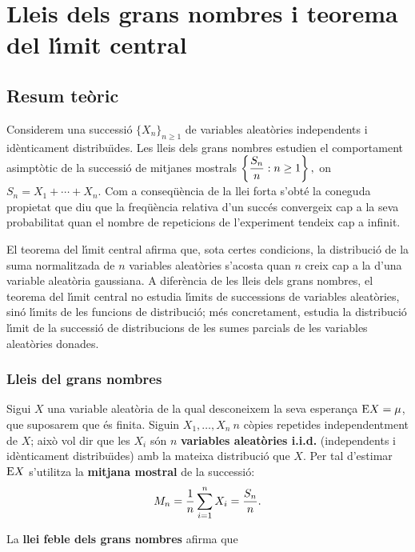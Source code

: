 \chapter{Lleis dels grans nombres i teorema del l\'{\i}mit central}

\section{Resum te\`oric}

Considerem una successi\'o $\{ X_n \}_{n \geq 1}$ de variables aleat\`ories 
independents i id\`en\-ti\-ca\-ment distribu\"{\i}des. 
Les lleis dels grans nombres estudien el 
comportament asimpt\`otic de la successi\'o de mitjanes mostrals 
$\displaystyle \left\{ {S_n \over n} : n \geq 1 \right\},$ on $S_n = X_1 + \cdots + X_n.$ 
Com a conseq\"u\`encia de la llei forta s'obt\'e la coneguda propietat que 
diu que la freq\"u\`encia relativa d'un succ\'es convergeix cap a la seva
probabilitat quan el nombre de repeticions de l'experiment tendeix cap a infinit.

El teorema del l\'{\i}mit central afirma que, sota certes condicions, la distribuci\'o
de la suma normalitzada de $n$ variables aleat\`ories s'acosta quan $n$ creix cap
a la d'una variable aleat\`oria gaussiana. A difer\`encia de les lleis dels grans nombres, 
el teorema del l\'{\i}mit central no estudia l\'{\i}mits de successions de variables aleat\`ories, 
sin\'o l\'{\i}mits de les funcions de distribuci\'o; m\'es concretament, estudia la distribuci\'o l\'{\i}mit 
de la successi\'o de distribucions de les sumes parcials de les variables aleat\`ories donades.

\subsection{Lleis del grans nombres}

Sigui $X$ una variable aleat\`oria de la qual desconeixem la seva esperan\c ca ${\rm E} X =
\mu$, que suposarem que \'es finita. Siguin $X_1, \ldots , X_n \ n$ c\`opies
repetides independentment de $X$; aix\`o vol dir que les $X_i$ s\'on $n$  {\bf variables
aleat\`ories i.i.d.} (independents i id\`enticament distribu\"{\i}des)
 amb la mateixa
distribuci\'o que $X$. Per tal d'estimar ${\rm E} X$ s'utilitza la {\bf mitjana mostral} de la
successi\'o:
$$M_n = {1 \over n} \sum_{i=1}^n X_i =\frac{S_n}{n}.$$

La {\bf llei feble dels grans nombres} afirma que

